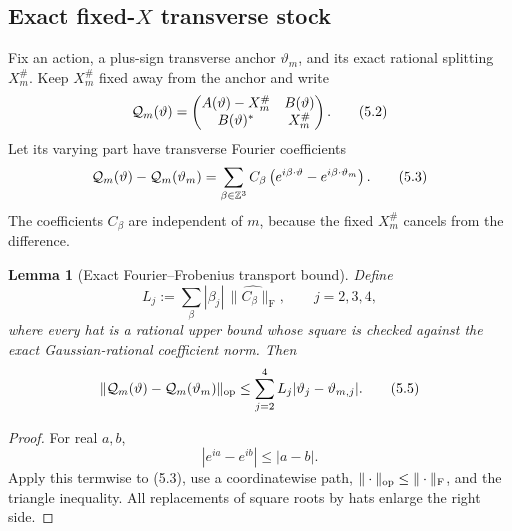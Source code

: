 \documentclass[11pt,oneside]{article}
\newtheorem{lemma}[theorem]{Lemma}
\theoremstyle{definition}
\theoremstyle{remark}
\begin{document}
\subsection{Exact fixed-\(X\) transverse stock}

Fix an action, a plus-sign transverse anchor \(\vartheta_m\), and its
exact rational splitting \(X_m^\#\).  Keep \(X_m^\#\) fixed away from
the anchor and write
\[
 {\cal Q}_{m}(\vartheta)
 =
 \begin{pmatrix}
 A(\vartheta)-X_m^\#&B(\vartheta)\\
 B(\vartheta)^*&X_m^\#
 \end{pmatrix}.                                           \tag{5.2}
\]
Let its varying part have transverse Fourier coefficients
\[
 {\cal Q}_{m}(\vartheta)-{\cal Q}_{m}(\vartheta_m)
 =\sum_{\beta\in\mathbb Z^3}
 C_\beta\left(e^{i\beta\cdot\vartheta}
             -e^{i\beta\cdot\vartheta_m}\right).          \tag{5.3}
\]
The coefficients \(C_\beta\) are independent of \(m\), because the
fixed \(X_m^\#\) cancels from the difference.

\begin{lemma}[Exact Fourier--Frobenius transport bound]
\label{lem:newv5-stock}
Define
\[
 L_j:=\sum_\beta|\beta_j|\,\widehat{\|C_\beta\|_{\mathrm F}},
 \qquad j=2,3,4,                                          \tag{5.4}
\]
where every hat is a rational upper bound whose square is checked
against the exact Gaussian-rational coefficient norm.  Then
\[
 \|{\cal Q}_{m}(\vartheta)-{\cal Q}_{m}(\vartheta_m)\|_{\rm op}
 \le\sum_{j=2}^4 L_j|\vartheta_j-\vartheta_{m,j}|.         \tag{5.5}
\]
\end{lemma}

\begin{proof}
For real \(a,b\),
\[
 |e^{ia}-e^{ib}|\le |a-b|.
\]
Apply this termwise to (5.3), use a coordinatewise path,
\(\|\cdot\|_{\rm op}\le\|\cdot\|_{\rm F}\), and the triangle
inequality.  All replacements of square roots by hats enlarge the
right side.
\end{proof}
\end{document}
